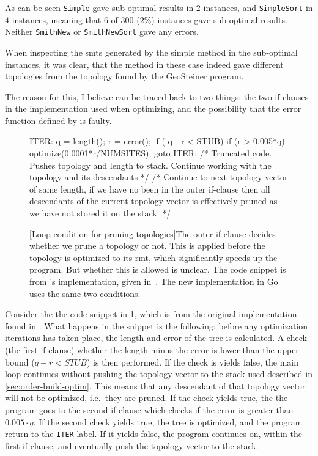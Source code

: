 As can be seen \texttt{Simple} gave sub-optimal results in $2$ instances, and
\texttt{SimpleSort} in $4$ instances, meaning that $6$ of $300$ ($2\%$) instances
gave sub-optimal results. Neither \texttt{SmithNew} or \texttt{SmithNewSort}
gave any errors.

When inspecting the \acp{smt} generated by the simple method in the sub-optimal
instances, it was clear, that the method in these case indeed gave different
topologies from the topology found by the GeoSteiner program.

The reason for this, I believe can be traced back to two things: the two
if-clauses in the implementation used when optimizing, and the possibility that
the error function defined by \citeauthor{smith1992} is faulty.

\begin{figure}[htbp]
  \begin{c-code}
    ITER:
    q = length();
    r = error();
    if ( q - r < STUB) {
      if (r > 0.005*q) {
        optimize(0.0001*r/NUMSITES);
        goto ITER;
      }
      /* Truncated code.
         Pushes topology and length to stack.
         Continue working with the topology and its descendants */
    }
    /* Continue to next topology vector of same length,
       if we have no been in the outer if-clause then all
       descendants of the current topology vector is 
       effectively pruned as we have not stored it on the stack. */
  \end{c-code}
  [Loop condition for pruning topologies]{The outer if-clause
    decides whether we prune a topology or not. This is applied before the
    topology is optimized to its \acs{rmt}, which significantly speeds up the
    program. But whether this is allowed is unclear. The code snippet is from
    \autocite{smith1992}'s implementation, given in~\cite{smith1992}. The new
    implementation in Go uses the same two
    conditions.\label{fig:loop-condition-pruning}}
\end{figure}

Consider the the code snippet in \cref{fig:loop-condition-pruning}, which is
from the original implementation found in \textcite{smith1992}. What happens in
the snippet is the following: before any optimization iterations has taken
place, the length and error of the tree is calculated. A check (the first if-clause) whether the
length minus the error is lower than the upper bound ($q-r < \textit{STUB}$)
is then performed. If the check is yields false, the main loop continues without
pushing the topology vector to the stack used described
in \cref{sec:order-build-optim}. This means that any descendant of that topology
vector will not be optimized, i.e.\ they are pruned. If the check yields true,
the the program goes to the second if-clause which checks if the error is
greater than $0.005 \cdot q$. If the second check yields true, the tree is
optimized, and the program return to the \texttt{ITER} label. If it yields
false, the program continues on, within the first if-clause, and eventually push
the topology vector to the stack.

